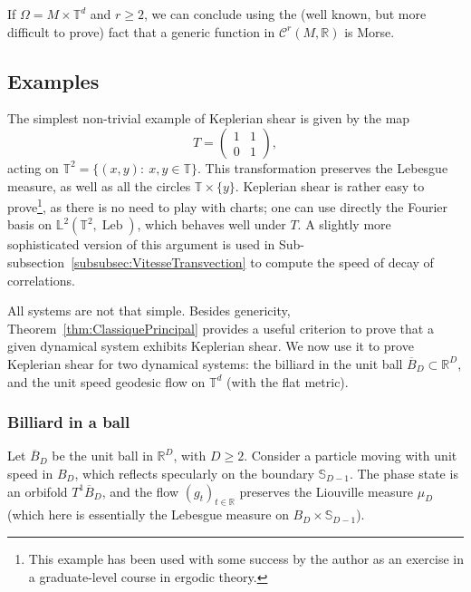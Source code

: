 \documentclass[AHL,Unicode,longabstracts]{cedram}
\DeclareMathOperator{\Leb}{Leb}
\newcommand{\R}{\mathbb{R}}
\newcommand{\Lbb}{\mathbb{L}}
\newcommand{\Sbb}{\mathbb{S}}
\newcommand{\Tbb}{\mathbb{T}}
\newcommand{\Ccal}{\mathcal{C}}
\begin{document}
\begin{rema}
If $\Omega = M \times \Tbb^d$ and $r \geq 2$, we can conclude using the (well known, but more difficult to prove) fact that a generic function in $\Ccal^r (M, \R)$ is Morse.
\end{rema}


\subsection{Examples}\label{subsec:Exemples}

The simplest non-trivial example of Keplerian shear is given by the map
\[
T =
\begin{pmatrix}
1 & 1 \\
0 & 1
\end{pmatrix},
\]
acting on $\Tbb^2 = \{(x,y): \ x,y \in \Tbb\}$. This transformation preserves the Lebesgue measure, as well as all the circles $\Tbb \times \{y\}$. Keplerian shear is rather easy to prove\footnote{This example has been used with some success by the author as an exercise in a graduate-level course in ergodic theory.}, as there is no need to play with charts; one can use directly the Fourier basis on $\Lbb^2 (\Tbb^2, \Leb)$, which behaves well under $T$. A slightly more sophisticated version of this argument is used in Sub-subsection~\ref{subsubsec:VitesseTransvection} to compute the speed of decay of correlations.


All systems are not that simple. Besides genericity, Theorem~\ref{thm:ClassiquePrincipal} provides a useful criterion to prove that a given dynamical system exhibits Keplerian shear. We now use it to prove Keplerian shear for two dynamical systems: the billiard in the unit ball $\overline{B}_D \subset \R^D$, and the unit speed geodesic flow on $\Tbb^d$ (with the flat metric).


\subsubsection{Billiard in a ball}\label{subsubsec:Billard}

Let $\overline{B}_D$ be the unit ball in $\R^D$, with $D \geq 2$. Consider a particle moving with unit speed in $B_D$, which reflects specularly on the boundary $\Sbb_{D-1}$. The phase state is an orbifold $T^1 \overline{B}_D$, and the flow $(g_t)_{t \in \R}$ preserves the Liouville measure $\mu_D$ (which here is essentially the Lebesgue measure on $B_D \times \Sbb_{D-1}$).
\end{document}
